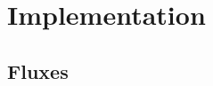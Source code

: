 \section{Implementation} \label{section:spectral_element_method:implementation}

\subsection{Fluxes} \label{section:spectral_element_method:implementation:fluxes}

